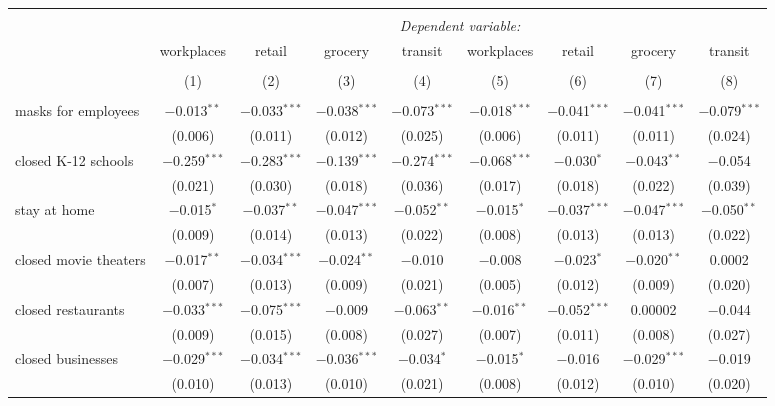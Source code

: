 \begin{tabular}{@{\extracolsep{1pt}}lcccccccc} 
\\[-1.8ex]\hline 
\hline \\[-1.8ex] 
 & \multicolumn{8}{c}{\textit{Dependent variable:}} \\ 
\cline{2-9} 
 & workplaces & retail & grocery & transit & workplaces & retail & grocery & transit \\ 
\\[-1.8ex] & (1) & (2) & (3) & (4) & (5) & (6) & (7) & (8)\\ 
\hline \\[-1.8ex] 
 masks for employees & $-$0.013$^{**}$ & $-$0.033$^{***}$ & $-$0.038$^{***}$ & $-$0.073$^{***}$ & $-$0.018$^{***}$ & $-$0.041$^{***}$ & $-$0.041$^{***}$ & $-$0.079$^{***}$ \\ 
  & (0.006) & (0.011) & (0.012) & (0.025) & (0.006) & (0.011) & (0.011) & (0.024) \\ 
  closed K-12 schools & $-$0.259$^{***}$ & $-$0.283$^{***}$ & $-$0.139$^{***}$ & $-$0.274$^{***}$ & $-$0.068$^{***}$ & $-$0.030$^{*}$ & $-$0.043$^{**}$ & $-$0.054 \\ 
  & (0.021) & (0.030) & (0.018) & (0.036) & (0.017) & (0.018) & (0.022) & (0.039) \\ 
  stay at home & $-$0.015$^{*}$ & $-$0.037$^{**}$ & $-$0.047$^{***}$ & $-$0.052$^{**}$ & $-$0.015$^{*}$ & $-$0.037$^{***}$ & $-$0.047$^{***}$ & $-$0.050$^{**}$ \\ 
  & (0.009) & (0.014) & (0.013) & (0.022) & (0.008) & (0.013) & (0.013) & (0.022) \\ 
  closed movie theaters & $-$0.017$^{**}$ & $-$0.034$^{***}$ & $-$0.024$^{**}$ & $-$0.010 & $-$0.008 & $-$0.023$^{*}$ & $-$0.020$^{**}$ & 0.0002 \\ 
  & (0.007) & (0.013) & (0.009) & (0.021) & (0.005) & (0.012) & (0.009) & (0.020) \\ 
  closed restaurants & $-$0.033$^{***}$ & $-$0.075$^{***}$ & $-$0.009 & $-$0.063$^{**}$ & $-$0.016$^{**}$ & $-$0.052$^{***}$ & 0.00002 & $-$0.044 \\ 
  & (0.009) & (0.015) & (0.008) & (0.027) & (0.007) & (0.011) & (0.008) & (0.027) \\ 
  closed businesses & $-$0.029$^{***}$ & $-$0.034$^{***}$ & $-$0.036$^{***}$ & $-$0.034$^{*}$ & $-$0.015$^{*}$ & $-$0.016 & $-$0.029$^{***}$ & $-$0.019 \\ 
  & (0.010) & (0.013) & (0.010) & (0.021) & (0.008) & (0.012) & (0.010) & (0.020) \\ 

\end{tabular}
